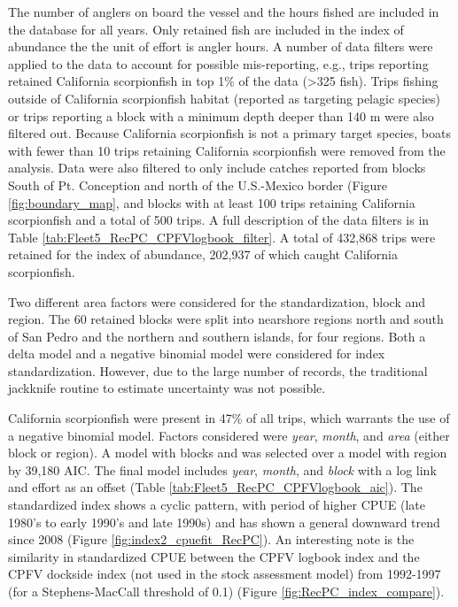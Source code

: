 \documentclass[12pt,]{article}
\begin{document}
The number of anglers on board the vessel and the hours fished are
included in the database for all years. Only retained fish are included
in the index of abundance the the unit of effort is angler hours. A
number of data filters were applied to the data to account for possible
mis-reporting, e.g., trips reporting retained California scorpionfish in
top 1\% of the data (\textgreater{}325 fish). Trips fishing outside of
California scorpionfish habitat (reported as targeting pelagic species)
or trips reporting a block with a minimum depth deeper than 140 m were
also filtered out. Because California scorpionfish is not a primary
target species, boats with fewer than 10 trips retaining California
scorpionfish were removed from the analysis. Data were also filtered to
only include catches reported from blocks South of Pt. Conception and
north of the U.S.-Mexico border (Figure \ref{fig:boundary_map}, and
blocks with at least 100 trips retaining California scorpionfish and a
total of 500 trips. A full description of the data filters is in Table
\ref{tab:Fleet5_RecPC_CPFVlogbook_filter}. A total of 432,868 trips were
retained for the index of abundance, 202,937 of which caught California
scorpionfish.

Two different area factors were considered for the standardization,
block and region. The 60 retained blocks were split into nearshore
regions north and south of San Pedro and the northern and southern
islands, for four regions. Both a delta model and a negative binomial
model were considered for index standardization. However, due to the
large number of records, the traditional jackknife routine to estimate
uncertainty was not possible.

California scorpionfish were present in 47\% of all trips, which
warrants the use of a negative binomial model. Factors considered were
\emph{year}, \emph{month}, and \emph{area} (either block or region). A
model with blocks and was selected over a model with region by 39,180
AIC. The final model includes \emph{year}, \emph{month}, and
\emph{block} with a log link and effort as an offset (Table
\ref{tab:Fleet5_RecPC_CPFVlogbook_aic}). The standardized index shows a
cyclic pattern, with period of higher CPUE (late 1980's to early 1990's
and late 1990s) and has shown a general downward trend since 2008
(Figure \ref{fig:index2_cpuefit_RecPC}). An interesting note is the
similarity in standardized CPUE between the CPFV logbook index and the
CPFV dockside index (not used in the stock assessment model) from
1992-1997 (for a Stephens-MacCall threshold of 0.1) (Figure
\ref{fig:RecPC_index_compare}).
\end{document}

